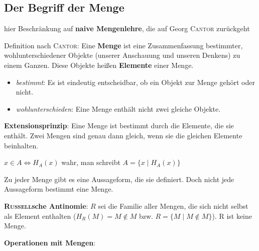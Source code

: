 \subsection {%
    Der Begriff der Menge%
}

hier Beschränkung auf \textbf{naive Mengenlehre}, die auf Georg \textsc{Cantor}
zurückgeht

Definition nach \textsc{Cantor}:
Eine \textbf{Menge} ist eine Zusammenfassung bestimmter, wohlunterschiedener
Objekte (unserer Anschauung und unseren Denkens) zu einem Ganzen.
Diese Objekte heißen \textbf{Elemente} einer Menge.

\begin{itemize}
    \item \emph{bestimmt}: Es ist eindeutig entscheidbar, ob ein Objekt zur
    Menge gehört oder nicht.
    
    \item \emph{wohlunterschieden}: Eine Menge enthält nicht zwei gleiche
    Objekte.
\end{itemize}

\textbf{Extensionsprinzip}: Eine Menge ist bestimmt durch die Elemente, die sie
enthält.
Zwei Mengen sind genau dann gleich, wenn sie die gleichen Elemente beinhalten.

$x \in A \Leftrightarrow H_{A}(x)$ wahr, man schreibt
$A = \{x \;|\; H_{A}(x)\}$

Zu jeder Menge gibt es eine Aussageform, die sie definiert.
Doch nicht jede Aussageform bestimmt eine Menge.

\textbf{\textsc{Russell}sche Antinomie}:
$R$ sei die Familie aller Mengen, die sich nicht selbst als Element enthalten
($H_{R}(M) = M \notin M$ bzw. $R = \{M \;|\; M \notin M\}$).
R ist keine Menge.

\textbf{Operationen mit Mengen}:

